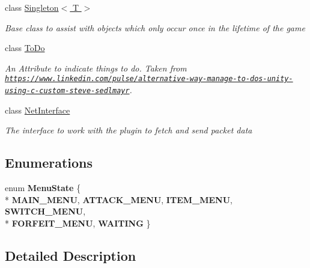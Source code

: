 \begin{DoxyCompactItemize}
class \hyperlink{class_singleton_3_01_t_01_4}{Singleton$<$ T $>$}
\begin{DoxyCompactList}\small\item\em Base class to assist with objects which only occur once in the lifetime of the game \end{DoxyCompactList}\item 
class \hyperlink{class_to_do}{To\-Do}
\begin{DoxyCompactList}\small\item\em An Attribute to indicate things to do. Taken from \href{https://www.linkedin.com/pulse/alternative-way-manage-to-dos-unity-using-c-custom-steve-sedlmayr}{\tt https\-://www.\-linkedin.\-com/pulse/alternative-\/way-\/manage-\/to-\/dos-\/unity-\/using-\/c-\/custom-\/steve-\/sedlmayr}. \end{DoxyCompactList}\item 
class \hyperlink{class_net_interface}{Net\-Interface}
\begin{DoxyCompactList}\small\item\em The interface to work with the plugin to fetch and send packet data \end{DoxyCompactList}\end{DoxyCompactItemize}
\subsection*{Enumerations}
\begin{DoxyCompactItemize}
\item 
enum {\bfseries Menu\-State} \{ \\*
{\bfseries M\-A\-I\-N\-\_\-\-M\-E\-N\-U}, 
{\bfseries A\-T\-T\-A\-C\-K\-\_\-\-M\-E\-N\-U}, 
{\bfseries I\-T\-E\-M\-\_\-\-M\-E\-N\-U}, 
{\bfseries S\-W\-I\-T\-C\-H\-\_\-\-M\-E\-N\-U}, 
\\*
{\bfseries F\-O\-R\-F\-E\-I\-T\-\_\-\-M\-E\-N\-U}, 
{\bfseries W\-A\-I\-T\-I\-N\-G}
 \}
\end{DoxyCompactItemize}


\subsection{Detailed Description}
